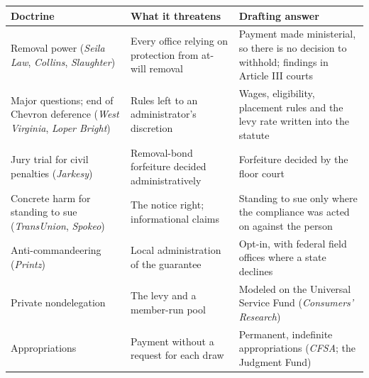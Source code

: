 \begingroup\small\renewcommand{\arraystretch}{1.12}
\begin{longtable}{@{}>{\raggedright\arraybackslash}p{}>{\raggedright\arraybackslash}p{}>{\raggedright\arraybackslash}p{}@{}}
\hline
\textbf{Doctrine} & \textbf{What it threatens} & \textbf{Drafting answer} \\
\hline
\endhead
Removal power (\emph{Seila Law}, \emph{Collins}, \emph{Slaughter}) & Every office relying on protection from at-will removal & Payment made ministerial, so there is no decision to withhold; findings in Article III courts \\ \hline
Major questions; end of Chevron deference (\emph{West Virginia}, \emph{Loper Bright}) & Rules left to an administrator's discretion & Wages, eligibility, placement rules and the levy rate written into the statute \\ \hline
Jury trial for civil penalties (\emph{Jarkesy}) & Removal-bond forfeiture decided administratively & Forfeiture decided by the floor court \\ \hline
Concrete harm for standing to sue (\emph{TransUnion}, \emph{Spokeo}) & The notice right; informational claims & Standing to sue only where the compliance was acted on against the person \\ \hline
Anti-commandeering (\emph{Printz}) & Local administration of the guarantee & Opt-in, with federal field offices where a state declines \\ \hline
Private nondelegation & The levy and a member-run pool & Modeled on the Universal Service Fund (\emph{Consumers' Research}) \\ \hline
Appropriations & Payment without a request for each draw & Permanent, indefinite appropriations (\emph{CFSA}; the Judgment Fund) \\ \hline
\end{longtable}
\endgroup


